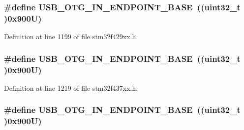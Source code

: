 \subsubsection[{\texorpdfstring{U\+S\+B\+\_\+\+O\+T\+G\+\_\+\+I\+N\+\_\+\+E\+N\+D\+P\+O\+I\+N\+T\+\_\+\+B\+A\+SE}{USB_OTG_IN_ENDPOINT_BASE}}]{\setlength{\rightskip}{0pt plus 5cm}\#define U\+S\+B\+\_\+\+O\+T\+G\+\_\+\+I\+N\+\_\+\+E\+N\+D\+P\+O\+I\+N\+T\+\_\+\+B\+A\+SE~((uint32\+\_\+t )0x900\+U)}\hypertarget{group___peripheral__memory__map_gad8f69041452615aeb3948600e3882246}{}\label{group___peripheral__memory__map_gad8f69041452615aeb3948600e3882246}


Definition at line 1199 of file stm32f429xx.\+h.

\subsubsection[{\texorpdfstring{U\+S\+B\+\_\+\+O\+T\+G\+\_\+\+I\+N\+\_\+\+E\+N\+D\+P\+O\+I\+N\+T\+\_\+\+B\+A\+SE}{USB_OTG_IN_ENDPOINT_BASE}}]{\setlength{\rightskip}{0pt plus 5cm}\#define U\+S\+B\+\_\+\+O\+T\+G\+\_\+\+I\+N\+\_\+\+E\+N\+D\+P\+O\+I\+N\+T\+\_\+\+B\+A\+SE~((uint32\+\_\+t )0x900\+U)}\hypertarget{group___peripheral__memory__map_gad8f69041452615aeb3948600e3882246}{}\label{group___peripheral__memory__map_gad8f69041452615aeb3948600e3882246}


Definition at line 1219 of file stm32f437xx.\+h.

\subsubsection[{\texorpdfstring{U\+S\+B\+\_\+\+O\+T\+G\+\_\+\+I\+N\+\_\+\+E\+N\+D\+P\+O\+I\+N\+T\+\_\+\+B\+A\+SE}{USB_OTG_IN_ENDPOINT_BASE}}]{\setlength{\rightskip}{0pt plus 5cm}\#define U\+S\+B\+\_\+\+O\+T\+G\+\_\+\+I\+N\+\_\+\+E\+N\+D\+P\+O\+I\+N\+T\+\_\+\+B\+A\+SE~((uint32\+\_\+t )0x900\+U)}\hypertarget{group___peripheral__memory__map_gad8f69041452615aeb3948600e3882246}{}\label{group___peripheral__memory__map_gad8f69041452615aeb3948600e3882246}


